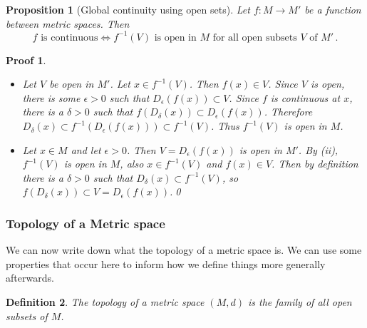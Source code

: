\documentclass{article}
\theoremstyle{plain}\theoremheaderfont{\normalfont\itshape}\theorembodyfont{\rmfamily}\theoremseparator{.}\newtheorem*{rem}{Remark}\newtheorem*{ex}{Example}\newtheorem*{proof}{Proof}\newtheorem*{altp}{Alternative proof}
\theoremstyle{plain}\theoremheaderfont{\normalfont\bfseries}\theorembodyfont{\rmfamily}\theoremseparator{.}\newtheorem{thm}{Theorem}[section]\newtheorem{lem}[thm]{Lemma}\newtheorem{prop}[thm]{Proposition}\newtheorem*{cor}{Corollary}\newtheorem{defn}[thm]{Definition}\newtheorem{clm}[thm]{Claim}\newtheorem{clminproof}{Claim}
\theoremstyle{break}\theoremheaderfont{\normalfont\itshape}\theorembodyfont{\rmfamily}\theoremseparator{.\medskip}\newtheorem*{proofskip}{Proof}\newtheorem*{exs}{Examples}\newtheorem*{rems}{Remarks}
\theoremstyle{break}\theoremheaderfont{\normalfont\bfseries}\theorembodyfont{\rmfamily}\theoremseparator{.\medskip}\newtheorem{lemskip}[thm]{Lemma}\newtheorem{defnskip}[thm]{Definition}\newtheorem{propskip}[thm]{Proposition}\newtheorem{thmskip}[thm]{Theorem}
\newcommand{\qed}{\hfill\ensuremath{\Box}}
\begin{document}
    \begin{prop}[Global continuity using open sets]
        Let \(f:M\to M'\) be a function between metric spaces. Then
        \[f \text{ is continuous}\iff f^{-1}(V) \text{ is open in } M \text{ for all open subsets } V \text{ of }M'\,.\]      
    \end{prop}
    \begin{proofskip}
        \begin{itemize}[topsep=0pt]
            \item[\((\Rightarrow)\)] Let \(V\) be open in \(M'\). Let \(x\in f^{-1}(V)\). Then \(f(x)\in V\). Since \(V\) is open, there is some \(\epsilon>0\) such that \(D_\epsilon(f(x))\subset V\). Since \(f\) is continuous at \(x\), there is a \(\delta>0\) such that \(f(D_\delta(x))\subset D_\epsilon(f(x))\). Therefore \(D_\delta(x)\subset f^{-1}(D_\epsilon(f(x)))\subset f^{-1}(V)\). Thus \(f^{-1}(V)\) is open in \(M\).
            \item[\((\Leftarrow)\)] Let \(x\in M\) and let \(\epsilon>0\). Then \(V=D_\epsilon(f(x))\) is open in \(M'\). By (ii), \(f^{-1}(V)\) is open in \(M\), also \(x\in f^{-1}(V)\) and \(f(x)\in V\). Then by definition there is a \(\delta>0\) such that \(D_\delta(x)\subset f^{-1}(V)\), so \(f(D_\delta(x))\subset V=D_\epsilon(f(x))\).\qed 
        \end{itemize}
    \end{proofskip}
    \subsubsection{Topology of a Metric space}
    We can now write down what the topology of a metric space is. We can use some properties that occur here to inform how we define things more generally afterwards.

    \begin{defn}
        The \textit{topology of a metric space} \((M,d)\) is the family of all open subsets of \(M\).
    \end{defn}
\end{document}
